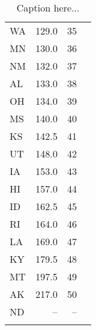 \begin{longtable}{lrrr}
WA    &   129.0 &    35 \\
MN    &   130.0 &    36 \\
NM    &   132.0 &    37 \\
AL    &   133.0 &    38 \\
OH    &   134.0 &    39 \\
MS    &   140.0 &    40 \\
KS    &   142.5 &    41 \\
UT    &   148.0 &    42 \\
IA    &   153.0 &    43 \\
HI    &   157.0 &    44 \\
ID    &   162.5 &    45 \\
RI    &   164.0 &    46 \\
LA    &   169.0 &    47 \\
KY    &   179.5 &    48 \\
MT    &   197.5 &    49 \\
AK    &   217.0 &    50 \\
ND    &      -- &    -- \\
        \caption{Caption here...}
        \label{tab:label_here}
\end{longtable}
